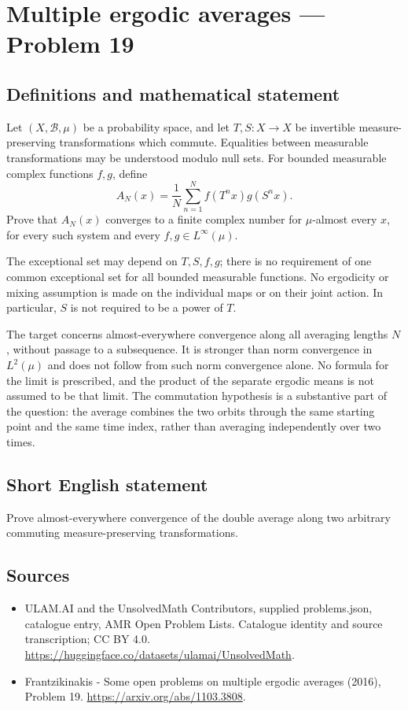 \documentclass[11pt,a4paper]{article}
\begin{document}
\section*{Multiple ergodic averages — Problem 19}\label{statement}

\subsection{Definitions and mathematical statement}
Let $(X,\mathcal B,\mu)$ be a probability space, and let
$T,S:X\to X$ be invertible measure-preserving transformations
which commute. Equalities between measurable transformations
may be understood modulo null sets. For bounded measurable
complex functions $f,g$, define
\[
                 A_N(x)=\frac1N\sum_{n=1}^N
                              f(T^n x)g(S^n x).
\]
Prove that $A_N(x)$ converges to a finite complex number
for $\mu$-almost every $x$, for every such system and
every $f,g\in L^\infty(\mu)$.

The exceptional set may depend on $T,S,f,g$; there
is no requirement of one common exceptional set for
all bounded measurable functions. No ergodicity or
mixing assumption is made on the individual maps or
on their joint action. In particular, $S$ is not
required to be a power of $T$.

The target concerns almost-everywhere convergence along
all averaging lengths $N$, without passage to a
subsequence. It is stronger than norm convergence
in $L^2(\mu)$ and does not follow from such norm
convergence alone. No formula for the limit is
prescribed, and the product of the separate ergodic
means is not assumed to be that limit. The
commutation hypothesis is a substantive part of the
question: the average combines the two orbits through
the same starting point and the same time index,
rather than averaging independently over two times.
\subsection{Short English statement}
Prove almost-everywhere convergence of the double average along two arbitrary commuting measure-preserving transformations.
\subsection{Sources}
\begin{itemize}
\item[S1] ULAM.AI and the UnsolvedMath Contributors, supplied problems.json, catalogue entry, AMR Open Problem Lists. Catalogue identity and source transcription; CC BY 4.0.
\url{https://huggingface.co/datasets/ulamai/UnsolvedMath}.
\item[S2] Frantzikinakis - Some open problems on multiple ergodic averages (2016), Problem 19. 
\url{https://arxiv.org/abs/1103.3808}.
\end{itemize}
\end{document}
